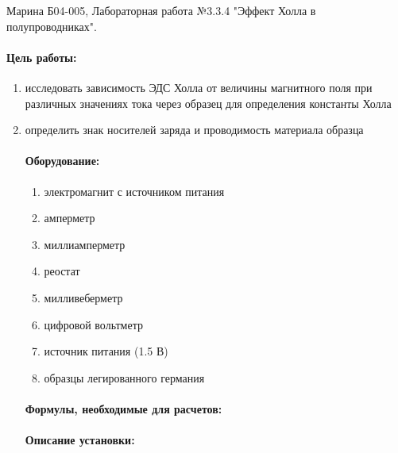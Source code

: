 \documentclass[a4paper,12pt]{article}
\author{Бичина Марина 
группа Б04-005 1 курса ФЭФМ}
\title{}
\date{}
\begin{document}

\begin{center}
\begin{Large}
{ Марина Б04-005, Лабораторная работа №3.3.4 "Эффект Холла в полупроводниках".}
\end{Large}
\end{center}
\paragraph{Цель работы:} 
\begin{enumerate}
\itemsep0em
\item исследовать зависимость ЭДС Холла от величины магнитного поля при различных значениях тока через образец для определения константы Холла 
\item определить знак носителей заряда и проводимость материала образца
\paragraph{Оборудование:}
\begin{enumerate}
\itemsep0em
\item электромагнит с источником питания
\item амперметр
\item миллиамперметр
\item реостат
\item милливеберметр
\item цифровой вольтметр
\item источник питания (1.5 В)
\item образцы легированного германия
\end{enumerate}
\paragraph{Формулы, необходимые для расчетов:}
\paragraph{}

\paragraph{Описание установки:}
\paragraph{}



\end{enumerate}
\end{document}
